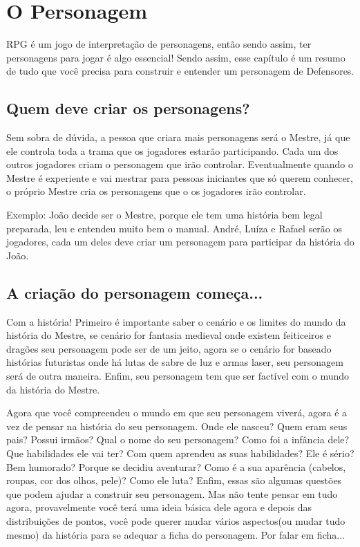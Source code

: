 \chapter{O Personagem}
\label{ch:character}

RPG é um jogo de interpretação de personagens, então sendo assim, ter personagens para jogar é algo essencial! Sendo assim, esse capítulo é um resumo de tudo que você precisa para construir e entender um personagem de Defensores.

\section{Quem deve criar os personagens?}

Sem sobra de dúvida, a pessoa que criara mais personagens será o Mestre, já que ele controla toda a trama que os jogadores estarão participando. Cada um dos outros jogadores criam o personagem que irão controlar. Eventualmente quando o Mestre é experiente e vai mestrar para pessoas iniciantes que só querem conhecer, o próprio Mestre cria os personagens que o os jogadores irão controlar. 

Exemplo: João decide ser o Mestre, porque ele tem uma história bem legal preparada, leu e entendeu muito bem o manual. André, Luíza e Rafael serão os jogadores, cada um deles deve criar um personagem para participar da história do João.

\section{A criação do personagem começa...}

Com a história! Primeiro é importante saber o cenário e os limites do mundo da história do Mestre, se cenário for fantasia medieval onde existem feiticeiros e dragões seu personagem pode ser de um jeito, agora se o cenário for baseado histórias futuristas onde há lutas de sabre de luz e armas laser, seu personagem será de outra maneira. Enfim, seu personagem tem que ser factível com o mundo da história do Mestre.

Agora que você compreendeu o mundo em que seu personagem viverá, agora é a vez de pensar na história do seu personagem. Onde ele nasceu? Quem eram seus pais? Possui irmãos? Qual o nome do seu personagem? Como foi a infância dele? Que habilidades ele vai ter? Com quem aprendeu as suas habilidades? Ele é sério? Bem humorado? Porque se decidiu aventurar? Como é a sua aparência (cabelos, roupas, cor dos olhos, pele)? Como ele luta? Enfim, essas são algumas questões que podem ajudar a construir seu personagem. Mas não tente pensar em tudo agora, provavelmente você terá uma ideia básica dele agora e depois das distribuições de pontos, você pode querer mudar vários aspectos(ou mudar tudo mesmo) da história para se adequar a ficha do personagem. Por falar em ficha...

